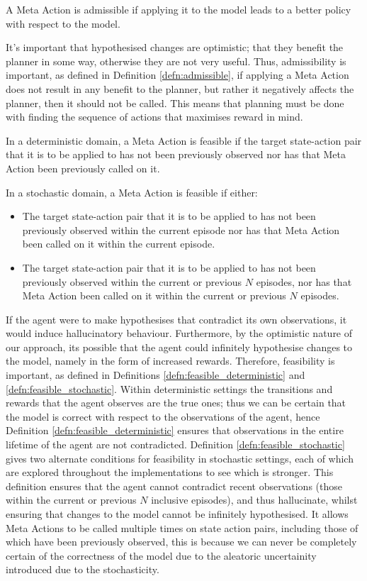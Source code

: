 \begin{defn}
\label{defn:admissible}
    A Meta Action is admissible if applying it to the model leads to a better policy with respect to the model.
\end{defn}
It's important that hypothesised changes are optimistic; that they benefit the planner in some way, otherwise they are not very useful. Thus, admissibility is important, as defined in Definition \ref{defn:admissible}, if applying a Meta Action does not result in any benefit to the planner, but rather it negatively affects the planner, then it should not be called. This means that planning must be done with finding the sequence of actions that maximises reward in mind.
\begin{defn}
\label{defn:feasible_deterministic}
In a deterministic domain, a Meta Action is feasible if the target state-action pair that it is to be applied to has not been previously observed nor has that Meta Action been previously called on it.
\end{defn}
\begin{defn}
\label{defn:feasible_stochastic}
In a stochastic domain, a Meta Action is feasible if either:
\begin{itemize}
    \item The target state-action pair that it is to be applied to has not been previously observed within the current episode nor has that Meta Action been called on it within the current episode.
    \item The target state-action pair that it is to be applied to has not been previously observed within the current or previous $N$ episodes, nor has that Meta Action been called on it within the current or previous $N$ episodes.
\end{itemize}
\end{defn}
If the agent were to make hypothesises that contradict its own observations, it would induce hallucinatory behaviour. Furthermore, by the optimistic nature of our approach, its possible that the agent could infinitely hypothesise changes to the model, namely in the form of increased rewards. Therefore, feasibility is important, as defined in Definitions \ref{defn:feasible_deterministic} and \ref{defn:feasible_stochastic}. Within deterministic settings the transitions and rewards that the agent observes are the true ones; thus we can be certain that the model is correct with respect to the observations of the agent, hence Definition \ref{defn:feasible_deterministic} ensures that observations in the entire lifetime of the agent are not contradicted. Definition \ref{defn:feasible_stochastic} gives two alternate conditions for feasibility in stochastic settings, each of which are explored throughout the implementations to see which is stronger. This definition ensures that the agent cannot contradict recent observations (those within the current or previous $N$ inclusive episodes), and thus hallucinate, whilst ensuring that changes to the model cannot be infinitely hypothesised. It allows Meta Actions to be called multiple times on state action pairs, including those of which have been previously observed, this is because we can never be completely certain of the correctness of the model due to the aleatoric uncertainity introduced due to the stochasticity.

